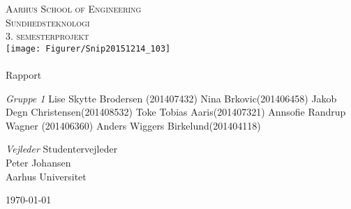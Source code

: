 \begin{titlingpage}
\begin{center}


\textsc{\LARGE Aarhus School of Engineering}\\[1cm]

\textsc{\Large Sundhedsteknologi}\\
\textsc{\Large 3. semesterprojekt}\\[1cm]

\texttt{[image: Figurer/Snip20151214\_103]}\\[1cm]

\noindent\makebox[\linewidth]{\rule{\textwidth}{0.4pt}}\\
[0.5cm]{\Huge Rapport}
\noindent\makebox[\linewidth]{\rule{\textwidth}{0.4pt}}

\end{center}

\textit{Gruppe 1} \newline
Lise Skytte Brodersen (201407432) \newline
Nina Brkovic(201406458) \newline
Jakob Degn Christensen(201408532) \newline
Toke Tobias Aaris(201407321) \newline		 
Annsofie Randrup Wagner (201406360) \newline 
Anders Wiggers Birkelund(201404118) \newline


\textit{Vejleder} \newline
Studentervejleder\\
Peter Johansen\\
Aarhus Universitet


\vfill

\begin{center}
{\large \today}
\end{center}


\end{titlingpage}
